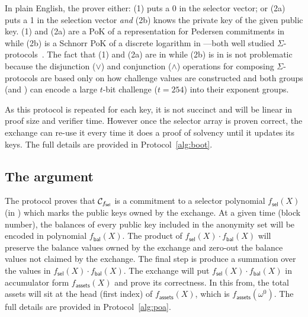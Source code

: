 In plain English, the prover either: (1) puts a 0 in the selector vector; or (2a) puts a 1 in the selection vector \textit{and} (2b) knows the private key of the given public key. (1) and (2a) are a PoK of a representation for Pedersen commitments in \bls while (2b) is a Schnorr PoK of a discrete logarithm in \secp---both well studied $\Sigma$-protocols~\cite{damgard10,sigma}. The fact that (1) and (2a) are in \bls while (2b) is in \secp is not problematic because the disjunction ($\lor$) and conjunction ($\land$) operations for composing $\Sigma$-protocols are based only on how challenge values are constructed and both groups (\secp and \bls) can encode a large $t$-bit challenge (\eg $t=254$) into their exponent groups. 

As this protocol is repeated for each key, it is not succinct and will be linear in proof size and verifier time. However once the selector array is proven correct, the exchange can re-use it every time it does a proof of solvency until it updates its keys. The full details are provided in Protocol~\ref{alg:boot}.




\subsection{The \poa argument}


The \bootstrap protocol proves that $\mathcal{C}_{f_\mathsf{sel}}$ is a commitment to a selector polynomial $f_\mathsf{sel}(X)$ (in \bls) which marks the public keys owned by the exchange. At a given time (block number), the balances of every public key included in the anonymity set will be encoded in polynomial $f_\mathsf{bal}(X)$. The product of $f_\mathsf{sel}(X)\cdot{f_\mathsf{bal}}(X)$ will preserve the balance values owned by the exchange and zero-out the balance values not claimed by the exchange. The final step is produce a summation over the values in $f_\mathsf{sel}(X)\cdot{f_\mathsf{bal}}(X)$. The exchange will put $f_\mathsf{sel}(X)\cdot{f_\mathsf{bal}}(X)$ in accumulator form $f_\mathsf{assets}(X)$ and prove its correctness. In this from, the total assets will sit at the head (first index) of $f_\mathsf{assets}(X)$, which is $f_\mathsf{assets}(\omega^0)$. The full details are provided in Protocol~\ref{alg:poa}.


